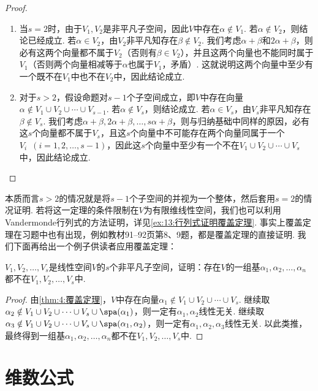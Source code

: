 \begin{proof}
    \begin{enumerate}
        \item 当$s=2$时，由于$V_1,V_2$是非平凡子空间，因此$V$中存在$\alpha\notin V_1$. 若$\alpha\notin V_2$，则结论已经成立. 若$\alpha\in V_2$，由$V_2$非平凡知存在$\beta\notin V_2$. 我们考虑$\alpha+\beta$和$2\alpha+\beta$，则必有这两个向量都不属于$V_2$（否则有$\beta\in V_2$），并且这两个向量也不能同时属于$V_1$（否则两个向量相减等于$\alpha$也属于$V_1$，矛盾）. 这就说明这两个向量中至少有一个既不在$V_1$中也不在$V_2$中，因此结论成立.

        \item 对于$s>2$，假设命题对$s-1$个子空间成立，即$V$中存在向量$\alpha\notin V_1\cup V_2\cup\cdots\cup V_{s-1}$. 若$\alpha\notin V_s$，则结论成立. 若$\alpha\in V_s$，由$V_s$非平凡知存在$\beta\notin V_s$. 我们考虑$\alpha+\beta,2\alpha+\beta,\ldots,s\alpha+\beta$，则与归纳基础中同样的原因，必有这$s$个向量都不属于$V_s$，且这$s$个向量中不可能存在两个向量同属于一个$V_i\enspace(i=1,2,\ldots,s-1)$，因此这$s$个向量中至少有一个不在$V_1\cup V_2\cup\cdots\cup V_s$中，因此结论成立.
    \end{enumerate}
\end{proof}

本质而言$s>2$的情况就是将$s-1$个子空间的并视为一个整体，然后套用$s=2$的情况证明. 若将这一定理的条件限制在$V$为有限维线性空间，我们也可以利用Vandermonde行列式的方法证明，详见\autoref{ex:13:行列式证明覆盖定理}. 事实上覆盖定理在习题中也有出现，例如教材91--92页第8、9题，都是覆盖定理的直接证明. 我们下面再给出一个例子供读者应用覆盖定理：
\begin{example}
    $V_1,V_2,\ldots,V_s$是线性空间$V$的$s$个非平凡子空间，证明：存在$V$的一组基$\alpha_1,\alpha_2,\ldots,\alpha_n$都不在$V_1,V_2,\ldots,V_s$中.
\end{example}

\begin{proof}
    由\autoref{thm:4:覆盖定理}，$V$中存在向量$\alpha_1\notin V_1\cup V_2\cup\cdots\cup V_s$. 继续取$\alpha_2\notin V_1\cup V_2\cup\cdots\cup V_s\cup\spa(\alpha_1)$，则一定有$\alpha_1,\alpha_2$线性无关. 继续取$\alpha_3\notin V_1\cup V_2\cup\cdots\cup V_s\cup\spa(\alpha_1,\alpha_2)$，则一定有$\alpha_1,\alpha_2,\alpha_3$线性无关. 以此类推，最终得到一组基$\alpha_1,\alpha_2,\ldots,\alpha_n$都不在$V_1,V_2,\ldots,V_s$中.
\end{proof}

\section{维数公式}

